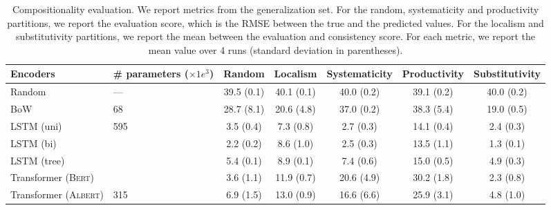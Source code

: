 \begin{table}[t]
    \footnotesize
    \begin{tabularx}{16cm}{lY|ccccc}
    \toprule
    \textbf{Encoders} & \textbf{\# parameters} ($\times 1e^3$) & \textbf{Random} & \textbf{Localism} & \textbf{Systematicity} & \textbf{Productivity} & \textbf{Substitutivity} \\
    \midrule
    Random & --- & 39.5 {\scriptsize (0.1)} & 40.1 {\scriptsize (0.1)} & 40.0  {\scriptsize (0.2)} & 39.1 {\scriptsize (0.2)} & 40.0 {\scriptsize (0.2)} \\
    BoW & 68 & 28.7 {\scriptsize (8.1)} & 20.6 {\scriptsize (4.8)} & 37.0 {\scriptsize (0.2)} & 38.3 {\scriptsize (5.4)} & 19.0 {\scriptsize (0.5)} \\
    \addlinespace
    \textsc{LSTM} (uni) & 595 & 3.5 {\scriptsize (0.4)} & 7.3 {\scriptsize (0.8)} & 2.7 {\scriptsize (0.3)} & 14.1 {\scriptsize (0.4)} & 2.4 {\scriptsize (0.3)} \\
    \textsc{LSTM} (bi) &  & 2.2 {\scriptsize (0.2)} & 8.6 {\scriptsize (1.0)} & 2.5 {\scriptsize (0.3)} & 13.5 {\scriptsize (1.1)} & 1.3 {\scriptsize (0.1)} \\
    \textsc{LSTM} (tree) &  & 5.4 {\scriptsize (0.1)} & 8.9 {\scriptsize (0.1)} & 7.4 {\scriptsize (0.6)} & 15.0 {\scriptsize (0.5)} & 4.9 {\scriptsize (0.3)} \\
    \addlinespace
    Transformer (\textsc{Bert}) &  & 3.6 {\scriptsize (1.1)} & 11.9 {\scriptsize (0.7)} &  20.6 {\scriptsize (4.9)} & 30.2 {\scriptsize (1.8)} &	2.3 {\scriptsize (0.8)} \\
    Transformer (\textsc{Albert}) & 315 & 6.9 {\scriptsize (1.5)} & 13.0 {\scriptsize (0.9)} & 16.6 {\scriptsize (6.6)} & 25.9 {\scriptsize (3.1)} &	 4.8 {\scriptsize (1.0)} \\
    \bottomrule
    \end{tabularx}
    \caption{Compositionality evaluation. We report metrics from the generalization set. For the random, systematicity and productivity partitions, we report the evaluation score, which is the RMSE between the true and the predicted values. For the localism and substitutivity partitions, we report the mean between the evaluation and consistency score. For each metric, we report the mean value over 4 runs (standard deviation in parentheses).} %
    \label{table:results-main}
\end{table}

